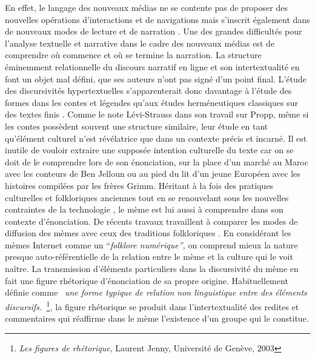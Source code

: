 En effet, le langage des nouveaux m\'edias ne se contente pas de proposer des nouvelles op\'erations d{\textquoteright}interactions et de navigations mais s{\textquoteright}inscrit \'egalement dans de nouveaux modes de lecture et de narration \citep{Manovich2001}. Une des grandes difficult\'es pour l{\textquoteright}analyse textuelle et narrative dans le cadre des nouveaux m\'edias est de comprendre o\`u commence et o\`u se termine la narration. La structure \'eminemment relationnelle du discours narratif en ligne et son intertextualit\'e en font un objet mal d\'efini, que ses auteurs n{\textquoteright}ont pas sign\'e d{\textquoteright}un point final. L{\textquoteright}\'etude des discursivit\'es hypertextuelles s{\textquoteright}apparenterait donc davantage \`a l{\textquoteright}\'etude des formes dans les contes et l\'egendes qu{\textquoteright}aux \'etudes herm\'eneutiques classiques sur des textes finis \citep{Clement1995}. Comme le note L\'evi-Strauss dans son travail sur Propp, m\^eme si les contes poss\`edent souvent une structure similaire, leur \'etude en tant qu{\textquoteright}\'el\'ement culturel n{\textquoteright}est r\'ev\'elatrice que dans un contexte pr\'ecis et incarn\'e. Il est inutile de vouloir extraire une suppos\'ee intention culturelle du texte car on se doit de le comprendre lors de son \'enonciation, sur la place d{\textquoteright}un march\'e au Maroc avec les conteurs de Ben Jelloun ou au pied du lit d{\textquoteright}un jeune Europ\'een avec les histoires compil\'ees par les fr\`eres Grimm. H\'eritant \`a la fois des pratiques culturelles et folkloriques anciennes tout en se renouvelant sous les nouvelles contraintes de la technologie \citep{Barber2008}, le m\`eme est lui aussi \`a comprendre dans son contexte d{\textquoteright}\'enonciation. De r\'ecents travaux travaillent \`a comparer les modes de diffusion des m\`emes avec ceux des traditions folkloriques \citep{Seta2014}. En consid\'erant les m\`emes Internet comme un {\textquotedblleft}\textit{folklore num\'erique{\textquotedblright}, }on comprend mieux la nature presque auto-r\'ef\'erentielle de la relation entre le m\`eme et la culture qui le voit na\^itre. La transmission d{\textquoteright}\'el\'ements particuliers dans la discursivit\'e du m\`eme en fait une figure rh\'etorique d{\textquoteright}\'enonciation de sa propre origine. Habituellement d\'efinie comme \textit{{\guillemotleft}~une forme typique de relation non linguistique entre des \'el\'ements discursifs.~{\guillemotright}}\footnote{ \textit{Les figures de rh\'etorique}, Laurent Jenny, Universit\'e de Gen\`eve, 2003}\textit{, }la figure rh\'etorique se produit dans l{\textquoteright}intertextualit\'e des redites et commentaires qui r\'eaffirme dans le m\`eme l{\textquoteright}existence d{\textquoteright}un groupe qui le constitue.  

